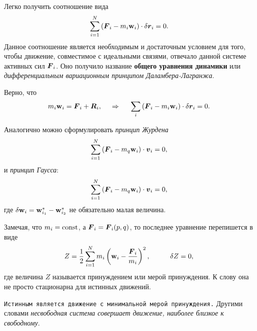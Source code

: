
Легко получить соотношение вида
\begin{equation}
    \sum_{i=1}^N \left(
        \mbox{\boldmath $F$}_i - m_i \mbox{\boldmath $\mathrm{w}$}_i
    \right) \cdot \delta \mbox{\boldmath $r$}_i = 0.
\end{equation}
Данное соотношение является необходимым и достаточным условием для того, чтобы движение, совместимое с идеальными связями, отвечало данной системе активных сил $\mbox{\boldmath $F$}_i$. Оно получило название \textbf{общего уравнения динамики} или \textit{дифференциальным вариационным принципом Даламбера-Лагранжа}.

\begin{to_thr} 
Верно, что
\begin{equation*}
    m_i \mbox{\boldmath $\mathrm{w}$}_i = \mbox{\boldmath $F$}_i + \mbox{\boldmath $R$}_i,
    \hspace{0.5cm} \Rightarrow \hspace{0.5cm} 
    \sum_i \left(
       \mbox{\boldmath $F$}_i -  m_i \mbox{\boldmath $\mathrm{w}$}_i
    \right) \cdot \delta \mbox{\boldmath $r$}_i = 0.
\end{equation*}
\end{to_thr}

Аналогично можно сформулировать \textit{принцип Журдена}
\begin{equation}
    \sum_{i=1}^N \left(
        \mbox{\boldmath $F$}_i - m_q \mbox{\boldmath $\mathrm{w}$}_i
    \right) \cdot \mbox{\boldmath $v$}_i = 0,
\end{equation}
и \textit{принцип Гаусса}:
\begin{equation}
    \sum_{i=1}^N \left(
        \mbox{\boldmath $F$}_i - m_q \mbox{\boldmath $\mathrm{w}$}_i
    \right) \cdot \mbox{\boldmath $v$}_i = 0,
\end{equation}
где $\delta \mbox{\boldmath $\mathrm{w}$}_i = \mbox{\boldmath $\mathrm{w}$}^*_{i_1} - \mbox{\boldmath $\mathrm{w}$}^*_{i_2}$ не обязательно малая величина. 

Замечая, что $m_i = \text{const}$, а $\mbox{\boldmath $F$}_i = \mbox{\boldmath $F$}_i (p, q)$, то последнее уравнение перепишется в виде
\begin{equation*}
    Z = \frac{1}{2} \sum_{i=1}^N m_i 
    \left(
        \mbox{\boldmath $\mathrm{w}$}_i - \frac{\mbox{\boldmath $F$}_i}{m_i} 
    \right)^2,
    \hspace{1cm} 
    \delta Z = 0,
\end{equation*}
где величина $Z$ называется принуждением или мерой принуждения. К слову она не просто стационарна для истинных движений. 

\texttt{Истинным является движение с минимальной мерой принуждения.} Другими словами \textit{несвободная система совершает движение, наиболее близкое к свободному}. 

